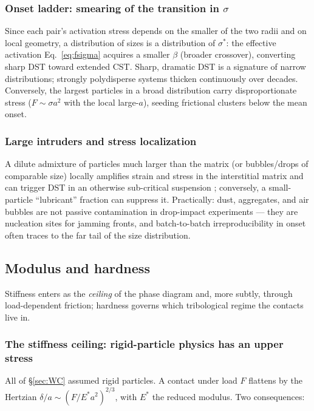 \documentclass[11pt]{article}
\newcommand{\sigmastar}{\sigma^{*}}
\begin{document}
\subsubsection{Onset ladder: smearing of the transition in $\sigma$}
Since each pair's activation stress depends on the smaller of the two radii and on local geometry, a distribution of sizes is a distribution of $\sigmastar$: the effective activation Eq.~\eqref{eq:fsigma} acquires a smaller $\beta$ (broader crossover), converting sharp DST toward extended CST. Sharp, dramatic DST is a signature of narrow distributions; strongly polydisperse systems thicken continuously over decades. Conversely, the largest particles in a broad distribution carry disproportionate stress ($F \sim \sigma a^2$ with the local large-$a$), seeding frictional clusters below the mean onset.

\subsubsection{Large intruders and stress localization}
A dilute admixture of particles much larger than the matrix (or bubbles/drops of comparable size) locally amplifies strain and stress in the interstitial matrix and can trigger DST in an otherwise sub-critical suspension \cite{madraki2017}; conversely, a small-particle ``lubricant'' fraction can suppress it. Practically: dust, aggregates, and air bubbles are not passive contamination in drop-impact experiments --- they are nucleation sites for jamming fronts, and batch-to-batch irreproducibility in onset often traces to the far tail of the size distribution.

\subsection{Modulus and hardness}
\label{sec:modulus}

Stiffness enters as the \emph{ceiling} of the phase diagram and, more subtly, through load-dependent friction; hardness governs which tribological regime the contacts live in.

\subsubsection{The stiffness ceiling: rigid-particle physics has an upper stress}
All of \S\ref{sec:WC} assumed rigid particles. A contact under load $F$ flattens by the Hertzian $\delta/a \sim (F/E^{*}a^{2})^{2/3}$, with $E^{*}$ the reduced modulus. Two consequences:
\end{document}
